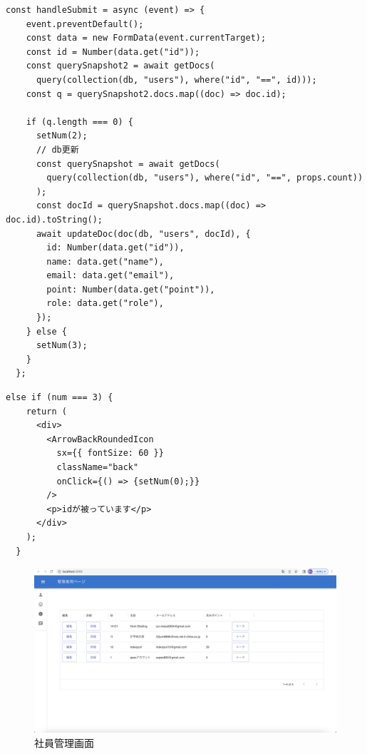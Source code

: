 \begin{lstlisting}[caption=社員IDが被った時の処理]
  const handleSubmit = async (event) => {
    event.preventDefault();
    const data = new FormData(event.currentTarget);
    const id = Number(data.get("id"));
    const querySnapshot2 = await getDocs(
      query(collection(db, "users"), where("id", "==", id)));
    const q = querySnapshot2.docs.map((doc) => doc.id);

    if (q.length === 0) {
      setNum(2);
      // db更新
      const querySnapshot = await getDocs(
        query(collection(db, "users"), where("id", "==", props.count))
      );
      const docId = querySnapshot.docs.map((doc) => doc.id).toString();
      await updateDoc(doc(db, "users", docId), {
        id: Number(data.get("id")),
        name: data.get("name"),
        email: data.get("email"),
        point: Number(data.get("point")),
        role: data.get("role"),
      });
    } else {
      setNum(3);
    }
  };
\end{lstlisting}

\begin{lstlisting}[caption=社員IDが被った時の処理]
  else if (num === 3) {
    return (
      <div>
        <ArrowBackRoundedIcon
          sx={{ fontSize: 60 }}
          className="back"
          onClick={() => {setNum(0);}}
        />
        <p>idが被っています</p>
      </div>
    );
  }
\end{lstlisting}

\begin{figure}[!h]
	\begin{center}
			\includegraphics[scale=0.3, clip]{./img/sample6.png}
			\caption{社員管理画面}
			\label{fig:図の名前}
	\end{center}
\end{figure}

